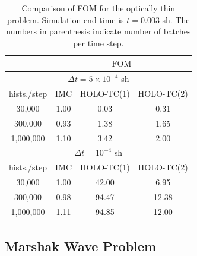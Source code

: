 \documentclass{anstrans}
\newcommand{\FOM}{\ensuremath{\text{FOM}}}
\begin{document}
\begin{table}
\centering
\caption{\label{tab:fom_thin} {Comparison of FOM for the optically
    thin problem.  Simulation end time is $t=0.003$ sh. The numbers in parenthesis indicate number of
batches per time step.}}
\begin{tabular}{|c|ccc|}\cline{2-4}
    \multicolumn{1}{c|}{}       &
    \multicolumn{3}{|c|}{\FOM} \\ \hline
    \multicolumn{4}{|c|}{$\Delta t = 5\times10^{-4}$ sh} \\\hline
hists./step   &   IMC   & HOLO-TC(1) & HOLO-TC(2) \\ \hline
   30,000     &   1.00  & 0.03  &  0.31      \\
  300,000     &   0.93  & 1.38  &  1.65     \\ 
  1,000,000   &   1.10  & 3.42  &  2.00      \\ \hline
    \multicolumn{4}{|c|}{$\Delta t = 10^{-4}$ sh} \\\hline
hists./step   &  IMC   & HOLO-TC(1) & HOLO-TC(2) \\ \hline
   30,000     &  1.00  &  42.00    & 6.95    \\
  300,000     &  0.98  &  94.47    & 12.38    \\ 
  1,000,000   &  1.11  &  94.85    & 12.00   \\ \hline
\end{tabular}
\end{table}

\subsection{Marshak Wave Problem}
\end{document}
